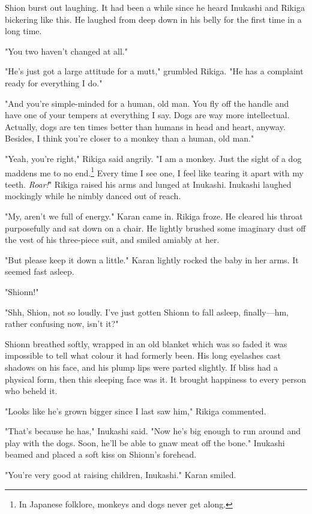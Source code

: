 Shion burst out laughing. It had been a while since he heard Inukashi
and Rikiga bickering like this. He laughed from deep down in his belly
for the first time in a long time.

"You two haven't changed at all."

"He's just got a large attitude for a mutt," grumbled Rikiga. "He has a
complaint ready for everything I do."

"And you're simple-minded for a human, old man. You fly off the handle
and have one of your tempers at everything I say. Dogs are way more
intellectual. Actually, dogs are ten times better than humans in head
and heart, anyway. Besides, I think you're closer to a monkey than a
human, old man."

"Yeah, you're right," Rikiga said angrily. "I am a monkey. Just the
sight of a dog maddens me to no end.\footnote{In Japanese folklore, monkeys and dogs never get along.} Every time I see one, I feel like
tearing it apart with my teeth. \emph{Roar!}" Rikiga raised his arms and lunged
at Inukashi. Inukashi laughed mockingly while he nimbly danced out of
reach.

"My, aren't we full of energy." Karan came in. Rikiga froze. He cleared
his throat purposefully and sat down on a chair. He lightly brushed some
imaginary dust off the vest of his three-piece suit, and smiled amiably
at her.

"But please keep it down a little." Karan lightly rocked the baby in her
arms. It seemed fast asleep.

"Shionn!"

"Shh, Shion, not so loudly. I've just gotten Shionn to fall asleep,
finally---hm, rather confusing now, isn't it?"

Shionn breathed softly, wrapped in an old blanket which was so faded it
was impossible to tell what colour it had formerly been. His long
eyelashes cast shadows on his face, and his plump lips were parted
slightly. If bliss had a physical form, then this sleeping face was it.
It brought happiness to every person who beheld it.

"Looks like he's grown bigger since I last saw him," Rikiga commented.

"That's because he has," Inukashi said. "Now he's big enough to run
around and play with the dogs. Soon, he'll be able to gnaw meat off the
bone." Inukashi beamed and placed a soft kiss on Shionn's forehead.

"You're very good at raising children, Inukashi." Karan smiled.

